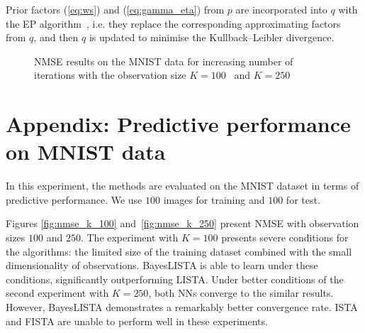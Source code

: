 \documentclass{article}
\begin{document}
  Prior factors (\ref{eq:ws}) and (\ref{eq:gamma_eta}) from $p$ are incorporated into $q$ with the EP algorithm~\cite{hernandez2015probabilistic}, i.e. they replace the corresponding approximating factors from $q$, and then $q$ is updated to minimise the Kullback--Leibler divergence.
  
   \begin{figure}[!t]
  \centering
  \hfil
  \caption{NMSE results on the MNIST data for increasing number of iterations with the observation size $K = 100$~\protect{} and $K = 250$~\protect{}}
  \label{fig:number_of_layers_synthetic}
  \end{figure}    

\section{Appendix: Predictive performance on MNIST data}
\label{app:mnist}
In this experiment, the methods are evaluated on the MNIST dataset in terms of predictive performance. We use $100$ images for training and $100$ for test.
  
  Figures \ref{fig:nmse_k_100} and~\ref{fig:nmse_k_250} present NMSE with observation sizes $100$ and $250$. The experiment with $K=100$ presents severe conditions for the algorithms: the limited size of the training dataset combined with the small dimensionality of observations. BayesLISTA is able to learn under these conditions, significantly outperforming LISTA. Under better conditions of the second experiment with $K=250$, both NNs converge to the similar results. However, BayesLISTA demonstrates a remarkably better convergence rate. ISTA and FISTA are unable to perform well in these experiments.
\end{document}
